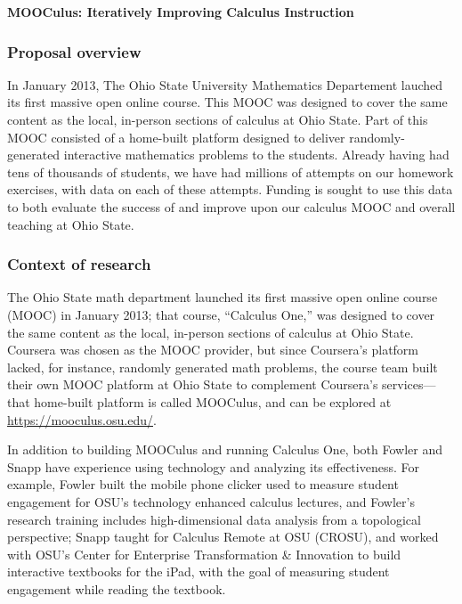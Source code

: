 \documentclass[12pt]{article}
\begin{document}
\begin{center}
  \textbf{MOOCulus: Iteratively Improving Calculus Instruction}
\end{center}

\subsubsection*{Proposal overview}

In January 2013, The Ohio State University Mathematics Departement
lauched its first massive open online course. This MOOC was designed
to cover the same content as the local, in-person sections of calculus
at Ohio State. Part of this MOOC consisted of a home-built platform
designed to deliver randomly-generated interactive mathematics
problems to the students. Already having had tens of thousands of
students, we have had millions of attempts on our homework exercises,
with data on each of these attempts.  Funding is sought to use this
data to both evaluate the success of and improve upon our calculus
MOOC and overall teaching at Ohio State.


\subsubsection*{Context of research}

The Ohio State math department launched its first massive open online
course (MOOC) in January 2013; that course, ``Calculus One,'' was
designed to cover the same content as the local, in-person sections of
calculus at Ohio State.  Coursera was chosen as the MOOC provider, but
since Coursera's platform lacked, for instance, randomly generated
math problems, the course team built their own MOOC platform at Ohio
State to complement Coursera's services---that home-built platform is
called MOOCulus, and can be explored at
\url{https://mooculus.osu.edu/}.

In addition to building MOOCulus and running Calculus One, both Fowler
and Snapp have experience using technology and analyzing its
effectiveness.  For example, Fowler built the mobile phone clicker
used to measure student engagement for OSU's technology enhanced
calculus lectures, and Fowler's research training includes
high-dimensional data analysis from a topological perspective; Snapp
taught for Calculus Remote at OSU (CROSU), and worked with OSU's
Center for Enterprise Transformation \& Innovation to build
interactive textbooks for the iPad, with the goal of measuring student
engagement while reading the textbook.
\end{document}
